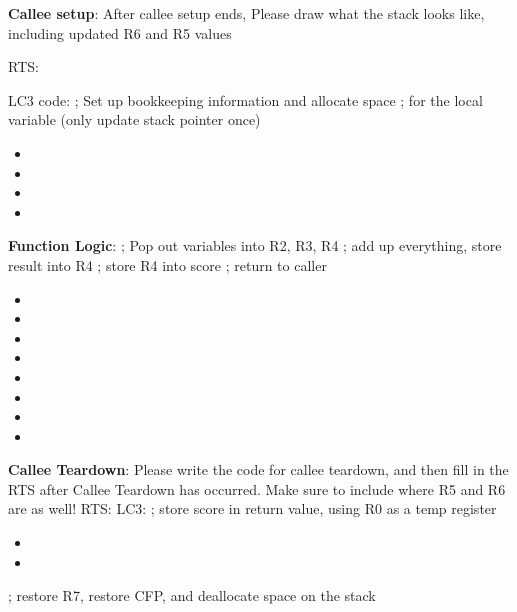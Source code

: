 \documentclass{article}
\begin{document}
\begin{enumerate}[label=(\alph*), itemsep = 120pt]
  \textbf{Callee setup}: After callee setup ends, Please draw what the stack looks like, including updated R6 and R5 values 
  
RTS:
 \newline
 \newline
 \newline
 \newline
 \newline
 \newline
 \newline
 \newline
 \newline
 \newline
 
 LC3 code:
  \newline
; Set up bookkeeping information and allocate space
\newline
; for the local variable (only update stack pointer once) 
 \begin{itemize}
    \item  
    \item   
    \item   
    \item     
\end{itemize}



\textbf{Function Logic}:
\newline
; Pop out variables into R2, R3, R4
\newline
; add up everything, store result into R4
\newline
; store R4 into score
\newline
; return to caller
 \begin{itemize}
    \item 
    \item 
    \item 
    \item 
    \item 
    \item 
    \item 
    \item 
    
    
\end{itemize}

\textbf{Callee Teardown}: Please write the code for callee teardown, and then fill in the RTS after Callee Teardown has occurred. Make sure to include where R5 and R6 are as well!
RTS:
\newline
\newline
\newline
\newline
\newline
\newline
\newpage
LC3:
\newline
; store score in return value, using R0 as a temp register
\begin{itemize}
    \item 
    \item 
\end{itemize}
; restore R7, restore CFP, and deallocate space on the stack


\end{enumerate}
\end{document}
